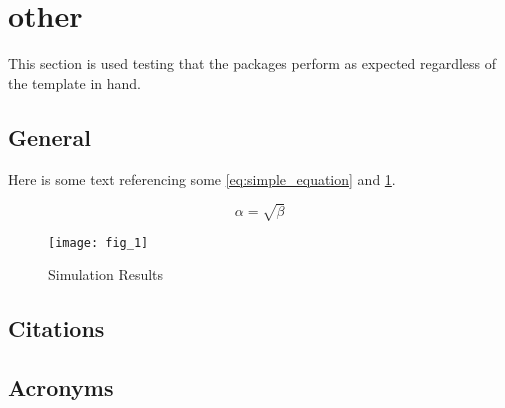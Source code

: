 \graphicspath{ {./content/other/figures/} }

\section{other}
\label{sec:other}  %

This section is used testing that the packages perform as expected regardless of the template in hand.

\subsection{General}
\label{sec:other:general}
Here is some text referencing some \cref{eq:simple_equation} and \cref{fig:simulationfigure}.

\begin{equation}
    \label{eq:simple_equation}
    \alpha = \sqrt{ \beta }
\end{equation}

\begin{figure}
    \centering
    \texttt{[image: fig\_1]}
    \caption{Simulation Results}
    \label{fig:simulationfigure}
\end{figure}

\subsection{Citations}
\label{sec:other:citations}


\subsection{Acronyms}
\label{sec:other:acro}




